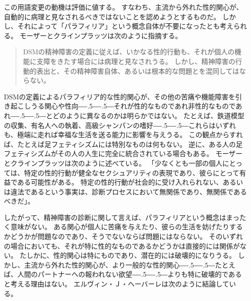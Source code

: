 \documentclass[paper=a4,book,openany]{jlreq}
\newcommand{\ig}[1]{}           %
\def\DDASH{―\kern-.5\zw―\kern-.5\zw―} %
\begin{document}
この用語変更の動機は評価に値する。
すなわち、主流から外れた性的関心が、自動的に病理と見なされるべきではないことを認めようとするものだ。
しかし、それによって「パラフィリア」という概念自体が不要になったとも考えられる。
モーザーとクラインプラッツは次のように指摘する。

\begin{quote}
  DSMの精神障害の定義に従えば、いかなる性的行動も、それが個人の機能に支障をきたす場合には病理と見なされうる。
しかし、精神障害の行動的表出と、その精神障害自体、あるいは根本的な問題とを混同してはならない。
\citep[p.103]{moser05:_dsm_iv_tr_parap}\ig{診断と統計マニュアル}

\end{quote}

DSM\ig{診断と統計マニュアル}の定義によるパラフィリア的な性的関心が、その他の苦痛や機能障害を引き起こしうる関心や性向{\DDASH}それが性的なものであれ非性的なものであれ{\DDASH}とどのように異なるのかは明らかではない。
たとえば、鉄道模型の収集、有名人への執着、高級シャンパンの嗜好{\DDASH}これらはいずれも、極端に走れば幸福な生活を送る能力に影響を与えうる。
この観点からすれば、たとえば足フェティシズムには特別なものは何もない。
逆に、ある人の足フェティシズムがその人の人生に完全に統合されている場合もある。
モーザーとクラインプラッツは次のように述べている。
「少なくとも一部の個人にとっては、特定の性的行動が健全なセクシュアリティの表現であり、彼らにとって有益である可能性がある。
特定の性的行動が社会的に受け入れられない、あるいは違法であるという事実は、診断プロセスにおいて無関係であり、無関係であるべきだ」\citep[p.95]{moser05:_dsm_iv_tr_parap}。

したがって、精神障害の診断に関して言えば、パラフィリアという概念はまったく意味がない。
ある関心が個人に苦痛を与えたり、彼らの生活を妨げたりするかどうかが問題なのであり、そうでないならば問題にはならない。
そのいずれの場合においても、それが特に性的なものであるかどうかは直接的には関係がない。
たしかに、性的関心は特にものであり、潜在的には破壊的になりうる。
しかし、主流から外れた性的関心が、より一般的な性的関心{\DDASH}たとえば、人間のパートナーへの報われない欲望{\DDASH}よりも特に破壊的であると考える理由はない。
エルヴィン・Ｊ・ヘーバーレは次のように結論している。
\end{document}
